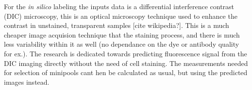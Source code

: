 For the \textit{in silico} labeling the inputs data is a differential interference contrast (DIC) microscopy, this is an optical microscopy technique used to enhance the contrast in unstained, transparent samples [cite wikipedia?]. This is a much cheaper image acquision technique that the staining process, and there is much less variability within it as well (no dependance on the dye or antibody quality for ex.). The research is dedicated towards predicting fluorescence signal from the DIC imaging directly without the need of cell staining. The measurements needed for selection of minipools cant hen be calculated as usual, but using the predicted images instead.
